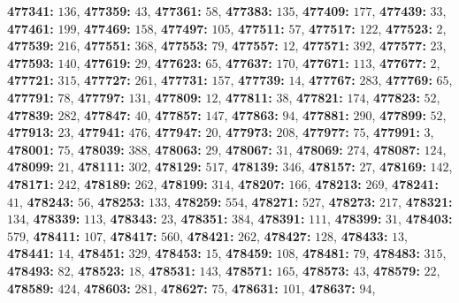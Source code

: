 \textsf{\bfseries 477341:} $136$, \textsf{\bfseries 477359:} $43$, \textsf{\bfseries 477361:} $58$, \textsf{\bfseries 477383:} $135$, \textsf{\bfseries 477409:} $177$, \textsf{\bfseries 477439:} $33$, \textsf{\bfseries 477461:} $199$, \textsf{\bfseries 477469:} $158$, \textsf{\bfseries 477497:} $105$, \textsf{\bfseries 477511:} $57$, \textsf{\bfseries 477517:} $122$, \textsf{\bfseries 477523:} $2$, \textsf{\bfseries 477539:} $216$, \textsf{\bfseries 477551:} $368$, \textsf{\bfseries 477553:} $79$, \textsf{\bfseries 477557:} $12$, \textsf{\bfseries 477571:} $392$, \textsf{\bfseries 477577:} $23$, \textsf{\bfseries 477593:} $140$, \textsf{\bfseries 477619:} $29$, \textsf{\bfseries 477623:} $65$, \textsf{\bfseries 477637:} $170$, \textsf{\bfseries 477671:} $113$, \textsf{\bfseries 477677:} $2$, \textsf{\bfseries 477721:} $315$, \textsf{\bfseries 477727:} $261$, \textsf{\bfseries 477731:} $157$, \textsf{\bfseries 477739:} $14$, \textsf{\bfseries 477767:} $283$, \textsf{\bfseries 477769:} $65$, \textsf{\bfseries 477791:} $78$, \textsf{\bfseries 477797:} $131$, \textsf{\bfseries 477809:} $12$, \textsf{\bfseries 477811:} $38$, \textsf{\bfseries 477821:} $174$, \textsf{\bfseries 477823:} $52$, \textsf{\bfseries 477839:} $282$, \textsf{\bfseries 477847:} $40$, \textsf{\bfseries 477857:} $147$, \textsf{\bfseries 477863:} $94$, \textsf{\bfseries 477881:} $290$, \textsf{\bfseries 477899:} $52$, \textsf{\bfseries 477913:} $23$, \textsf{\bfseries 477941:} $476$, \textsf{\bfseries 477947:} $20$, \textsf{\bfseries 477973:} $208$, \textsf{\bfseries 477977:} $75$, \textsf{\bfseries 477991:} $3$, \textsf{\bfseries 478001:} $75$, \textsf{\bfseries 478039:} $388$, \textsf{\bfseries 478063:} $29$, \textsf{\bfseries 478067:} $31$, \textsf{\bfseries 478069:} $274$, \textsf{\bfseries 478087:} $124$, \textsf{\bfseries 478099:} $21$, \textsf{\bfseries 478111:} $302$, \textsf{\bfseries 478129:} $517$, \textsf{\bfseries 478139:} $346$, \textsf{\bfseries 478157:} $27$, \textsf{\bfseries 478169:} $142$, \textsf{\bfseries 478171:} $242$, \textsf{\bfseries 478189:} $262$, \textsf{\bfseries 478199:} $314$, \textsf{\bfseries 478207:} $166$, \textsf{\bfseries 478213:} $269$, \textsf{\bfseries 478241:} $41$, \textsf{\bfseries 478243:} $56$, \textsf{\bfseries 478253:} $133$, \textsf{\bfseries 478259:} $554$, \textsf{\bfseries 478271:} $527$, \textsf{\bfseries 478273:} $217$, \textsf{\bfseries 478321:} $134$, \textsf{\bfseries 478339:} $113$, \textsf{\bfseries 478343:} $23$, \textsf{\bfseries 478351:} $384$, \textsf{\bfseries 478391:} $111$, \textsf{\bfseries 478399:} $31$, \textsf{\bfseries 478403:} $579$, \textsf{\bfseries 478411:} $107$, \textsf{\bfseries 478417:} $560$, \textsf{\bfseries 478421:} $262$, \textsf{\bfseries 478427:} $128$, \textsf{\bfseries 478433:} $13$, \textsf{\bfseries 478441:} $14$, \textsf{\bfseries 478451:} $329$, \textsf{\bfseries 478453:} $15$, \textsf{\bfseries 478459:} $108$, \textsf{\bfseries 478481:} $79$, \textsf{\bfseries 478483:} $315$, \textsf{\bfseries 478493:} $82$, \textsf{\bfseries 478523:} $18$, \textsf{\bfseries 478531:} $143$, \textsf{\bfseries 478571:} $165$, \textsf{\bfseries 478573:} $43$, \textsf{\bfseries 478579:} $22$, \textsf{\bfseries 478589:} $424$, \textsf{\bfseries 478603:} $281$, \textsf{\bfseries 478627:} $75$, \textsf{\bfseries 478631:} $101$, \textsf{\bfseries 478637:} $94$, 
